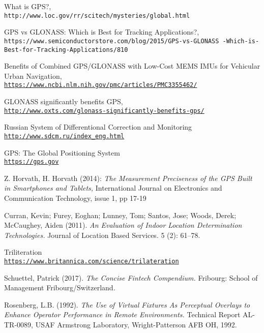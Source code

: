 \newpage
{}


\begin{thebibliography}{9}
What is GPS?,
\\\texttt{http://www.loc.gov/rr/scitech/mysteries/global.html}

GPS vs GLONASS: Which is Best for Tracking Applications?,
\\\texttt{https://www.semiconductorstore.com/blog/2015/GPS-vs-GLONASS
-Which-is-Best-for-Tracking-Applications/810}

Benefits of Combined GPS/GLONASS with Low-Cost MEMS IMUs for Vehicular Urban Navigation,
\\\texttt{\url{https://www.ncbi.nlm.nih.gov/pmc/articles/PMC3355462/}}

GLONASS significantly benefits GPS,
\\\texttt{\url{http://www.oxts.com/glonass-significantly-benefits-gps/}}

Russian System of Differentional Correction and Monitoring
\\\texttt{\url{http://www.sdcm.ru/index_eng.html}}

GPS: The Global Positioning System
\\\texttt{\url{https://gps.gov}}

Z. Horvath, H. Horvath (2014): 
\textit{The Measurement Preciseness of the GPS Built in Smartphones and Tablets,} International Journal on Electronics and Communication Technology, issue 1, pp 17-19

Curran, Kevin; Furey, Eoghan; Lunney, Tom; Santos, Jose; Woods, Derek; McCaughey, Aiden (2011). 
\textit{An Evaluation of Indoor Location Determination Technologies.}
Journal of Location Based Services. 5 (2): 61–78.

Triliteration
\\\texttt{\url{https://www.britannica.com/science/trilateration}}

Schuettel, Patrick (2017). 
\textit{The Concise Fintech Compendium.} Fribourg: School of Management Fribourg/Switzerland.

Rosenberg, L.B. (1992). 
\textit{The Use of Virtual Fixtures As Perceptual Overlays to Enhance Operator Performance in Remote Environments.}
Technical Report AL-TR-0089, USAF Armstrong Laboratory, Wright-Patterson AFB OH, 1992.


\end{thebibliography}
